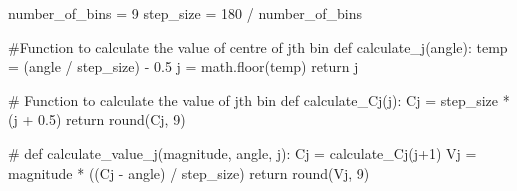 \documentclass[
  letterpaper,
  DIV=11,
  numbers=noendperiod]{scrreprt}
\newenvironment{Shaded}{\begin{snugshade}}{\end{snugshade}}
\newcommand{\BuiltInTok}[1]{\textcolor[rgb]{0.00,0.23,0.31}{#1}}
\newcommand{\CommentTok}[1]{\textcolor[rgb]{0.37,0.37,0.37}{#1}}
\newcommand{\ControlFlowTok}[1]{\textcolor[rgb]{0.00,0.23,0.31}{#1}}
\newcommand{\DecValTok}[1]{\textcolor[rgb]{0.68,0.00,0.00}{#1}}
\newcommand{\FloatTok}[1]{\textcolor[rgb]{0.68,0.00,0.00}{#1}}
\newcommand{\KeywordTok}[1]{\textcolor[rgb]{0.00,0.23,0.31}{#1}}
\newcommand{\NormalTok}[1]{\textcolor[rgb]{0.00,0.23,0.31}{#1}}
\newcommand{\OperatorTok}[1]{\textcolor[rgb]{0.37,0.37,0.37}{#1}}
\begin{document}
\begin{Shaded}
\begin{Highlighting}[]
\NormalTok{number\_of\_bins }\OperatorTok{=} \DecValTok{9}
\NormalTok{step\_size }\OperatorTok{=} \DecValTok{180} \OperatorTok{/}\NormalTok{ number\_of\_bins}
\end{Highlighting}
\end{Shaded}

\begin{Shaded}
\begin{Highlighting}[]
\CommentTok{\#Function to calculate the value of centre of jth bin}
\KeywordTok{def}\NormalTok{ calculate\_j(angle):}
\NormalTok{  temp }\OperatorTok{=}\NormalTok{ (angle }\OperatorTok{/}\NormalTok{ step\_size) }\OperatorTok{{-}} \FloatTok{0.5}
\NormalTok{  j }\OperatorTok{=}\NormalTok{ math.floor(temp)}
  \ControlFlowTok{return}\NormalTok{ j}
\end{Highlighting}
\end{Shaded}

\begin{Shaded}
\begin{Highlighting}[]
\CommentTok{\# Function to calculate the value of jth bin}
\KeywordTok{def}\NormalTok{ calculate\_Cj(j):}
\NormalTok{  Cj }\OperatorTok{=}\NormalTok{ step\_size }\OperatorTok{*}\NormalTok{ (j }\OperatorTok{+} \FloatTok{0.5}\NormalTok{)}
  \ControlFlowTok{return} \BuiltInTok{round}\NormalTok{(Cj, }\DecValTok{9}\NormalTok{)}
\end{Highlighting}
\end{Shaded}

\begin{Shaded}
\begin{Highlighting}[]
\CommentTok{\# }
\KeywordTok{def}\NormalTok{ calculate\_value\_j(magnitude, angle, j):}
\NormalTok{  Cj }\OperatorTok{=}\NormalTok{ calculate\_Cj(j}\OperatorTok{+}\DecValTok{1}\NormalTok{)}
\NormalTok{  Vj }\OperatorTok{=}\NormalTok{ magnitude }\OperatorTok{*}\NormalTok{ ((Cj }\OperatorTok{{-}}\NormalTok{ angle) }\OperatorTok{/}\NormalTok{ step\_size)}
  \ControlFlowTok{return} \BuiltInTok{round}\NormalTok{(Vj, }\DecValTok{9}\NormalTok{)}
\end{Highlighting}
\end{Shaded}
\end{document}
